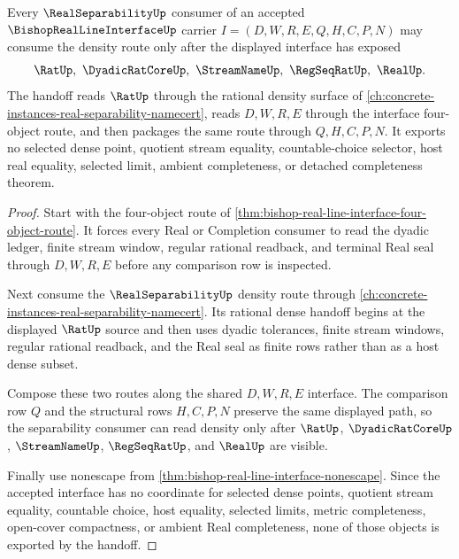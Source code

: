 \begin{theorem}
\label{thm:bishop-real-line-interface-real-separability-handoff}
Every $\RealSeparabilityUp$ consumer of an accepted $\BishopRealLineInterfaceUp$ carrier $I=(D,W,R,E,Q,H,C,P,N)$ may consume the density route only after the displayed interface has exposed
$$
\RatUp,\ \DyadicRatCoreUp,\ \StreamNameUp,\ \RegSeqRatUp,\ \RealUp .
$$
The handoff reads $\RatUp$ through the rational density surface of \autoref{ch:concrete-instances-real-separability-namecert}, reads $D,W,R,E$ through the interface four-object route, and then packages the same route through $Q,H,C,P,N$. It exports no selected dense point, quotient stream equality, countable-choice selector, host real equality, selected limit, ambient completeness, or detached completeness theorem.
\end{theorem}
\begin{proof}
Start with the four-object route of \autoref{thm:bishop-real-line-interface-four-object-route}. It forces every Real or Completion consumer to read the dyadic ledger, finite stream window, regular rational readback, and terminal Real seal through $D,W,R,E$ before any comparison row is inspected.

Next consume the $\RealSeparabilityUp$ density route through \autoref{ch:concrete-instances-real-separability-namecert}. Its rational dense handoff begins at the displayed $\RatUp$ source and then uses dyadic tolerances, finite stream windows, regular rational readback, and the Real seal as finite rows rather than as a host dense subset.

Compose these two routes along the shared $D,W,R,E$ interface. The comparison row $Q$ and the structural rows $H,C,P,N$ preserve the same displayed path, so the separability consumer can read density only after $\RatUp$, $\DyadicRatCoreUp$, $\StreamNameUp$, $\RegSeqRatUp$, and $\RealUp$ are visible.

Finally use nonescape from \autoref{thm:bishop-real-line-interface-nonescape}. Since the accepted interface has no coordinate for selected dense points, quotient stream equality, countable choice, host equality, selected limits, metric completeness, open-cover compactness, or ambient Real completeness, none of those objects is exported by the handoff.
\end{proof}

